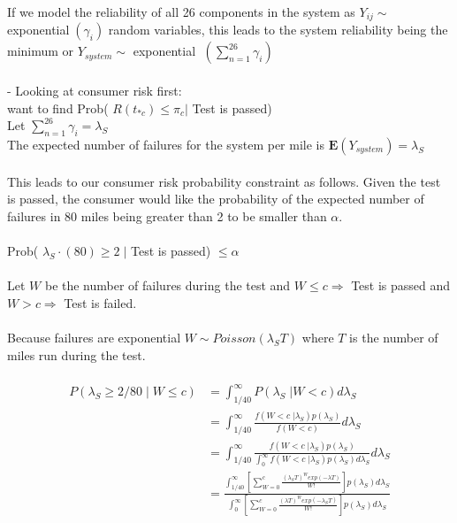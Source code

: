 \documentclass[12pt]{article}
\begin{document}
If we model the reliability of all 26 components in the system as $Y_{ij} \sim$
exponential$\;(\gamma_i) $ random variables, this leads to the system
reliability being the minimum or $Y_{system} \sim $ exponential
$ \;(\sum_{n = 1}^{26} \gamma_i) $
\\
\\
- Looking at consumer risk first:
\\
want to find Prob( $ R(t_{*c}) \leq \pi_c \vert $ Test is passed)
\\
Let $ \sum_{n = 1}^{26} \gamma_i = \lambda_S $
\\
The expected number of failures for the system per mile is
$ \mathbf{E}(Y_{system}) = \lambda_S $
\\
\\
This leads to our consumer risk probability constraint as follows.  Given the
test is passed, the consumer would like the probability of the expected number
of failures in 80 miles being greater than 2 to be smaller than $\alpha$.
\\
\\
Prob( $ \lambda_S \cdot (80) \geq 2 \; \vert $ Test is passed) $ \leq \alpha $
\\
\\
Let $ W $ be the number of failures during the test and $ W \leq c \Rightarrow $
Test is passed and $ W > c \Rightarrow $ Test is failed.
\\
\\
Because failures are exponential $ W \sim Poisson(\lambda_S T) $ where $ T $ is
the number of miles run during the test.
\\
\\
$$
\begin{aligned}
	 P(\lambda_S \geq 2/80 \; \vert \; W \leq c) &= \int_{1/40}^{\infty} P(\lambda_S \; \vert W < c) d\lambda_S \\
     &= \int_{1/40}^{\infty} \frac{f(W < c \; \vert \lambda_S) p(\lambda_S)}{f(W < c)}d\lambda_S\\
     &= \int_{1/40}^{\infty} \frac{f(W < c \; \vert \lambda_S) p(\lambda_S)}{\int_{0}^{\infty} f(W < c \; \vert \lambda_S) p(\lambda_S) d\lambda_S}d\lambda_S \\
     &= \frac{\int_{1/40}^{\infty} [ \sum_{W=0}^c \frac{(\lambda_S T)^W exp(-\lambda T)}{W!}]p(\lambda_S)d\lambda_S} {\int_{0}^{\infty} [ \sum_{W=0}^c \frac{(\lambda T)^W exp(-\lambda_S T)}{W!}]p(\lambda_S)d\lambda_S}
\end{aligned}
$$
\\
\\
\end{document}
